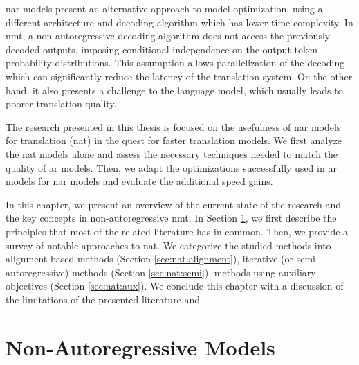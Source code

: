 
\Ac{nar} models present an alternative approach to model optimization, using a
different architecture and decoding algorithm which has lower time complexity.
In \ac{nmt}, a non-autoregressive decoding algorithm does not access the
previously decoded outputs, imposing conditional independence on the output
token probability distributions. This assumption allows parallelization of the
decoding which can significantly reduce the latency of the translation
system. On the other hand, it also presents a challenge to the language model,
which usually leads to poorer translation quality.

The research presented in this thesis is focused on the usefulness of \ac{nar}
models for translation (\acs{nat}) in the quest for faster
translation models. We first analyze the \ac{nat} models alone and assess the
necessary techniques needed to match the quality of \ac{ar} models.  Then, we
adapt the optimizations successfully used in \ac{ar} models for \ac{nar} models
and evaluate the additional speed gains.

In this chapter, we present an overview of the current state of the research
and the key concepts in non-autoregressive \ac{nmt}.  In Section
\ref{sec:nat:principles}, we first describe the principles that most of the
related literature has in common. Then, we provide a survey of notable
approaches to \ac{nat}. We categorize the studied methods into alignment-based
methods (Section \ref{sec:nat:alignment}), iterative (or semi-autoregressive)
methods (Section \ref{sec:nat:semi}), methods using auxiliary objectives
(Section \ref{sec:nat:aux}).  We conclude this chapter with a discussion of the
limitations of the presented literature and 


\section{Non-Autoregressive Models}%
\label{sec:nat:principles}

